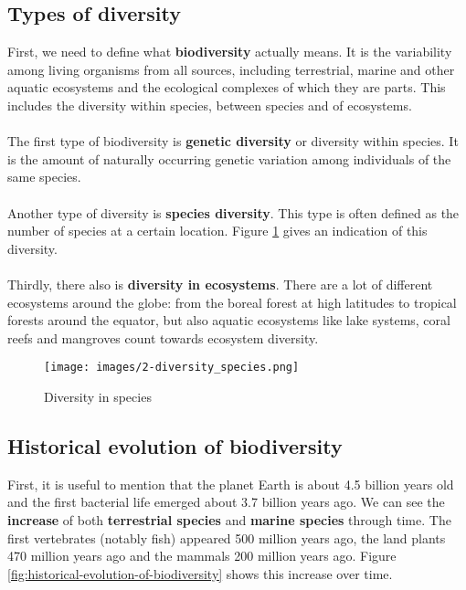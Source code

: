 \documentclass[../summary.tex]{subfiles}
\begin{document}
\subsection{Types of diversity}
First, we need to define what \textbf{biodiversity} actually means. It is the variability among living organisms from all sources, including terrestrial, marine and other aquatic ecosystems and the ecological complexes of which they are parts. This includes the diversity within species, between species and of ecosystems.
\\\\
The first type of biodiversity is \textbf{genetic diversity} or diversity within species. It is the amount of naturally occurring genetic variation among individuals of the same species.
\\\\
Another type of diversity is \textbf{species diversity}. This type is often defined as the number of species at a certain location. Figure \ref{fig:diversity_species} gives an indication of this diversity.
\\\\
Thirdly, there also is \textbf{diversity in ecosystems}. There are a lot of different ecosystems around the globe: from the boreal forest at high latitudes to tropical forests around the equator, but also aquatic ecosystems like lake systems, coral reefs and mangroves count towards ecosystem diversity.
\\
\begin{figure}[H]
	\centering
	\texttt{[image: images/2-diversity\_species.png]}
	\caption{Diversity in species}
	\label{fig:diversity_species}
\end{figure}

\subsection{Historical evolution of biodiversity}

First, it is useful to mention that the planet Earth is about 4.5 billion years old and the first bacterial life emerged about 3.7 billion years ago. We can see the \textbf{increase} of both \textbf{terrestrial species} and \textbf{marine species} through time. The first vertebrates (notably fish) appeared 500 million years ago, the land plants 470 million years ago and the mammals 200 million years ago. Figure \ref{fig:historical-evolution-of-biodiversity} shows this increase over time.
\end{document}
